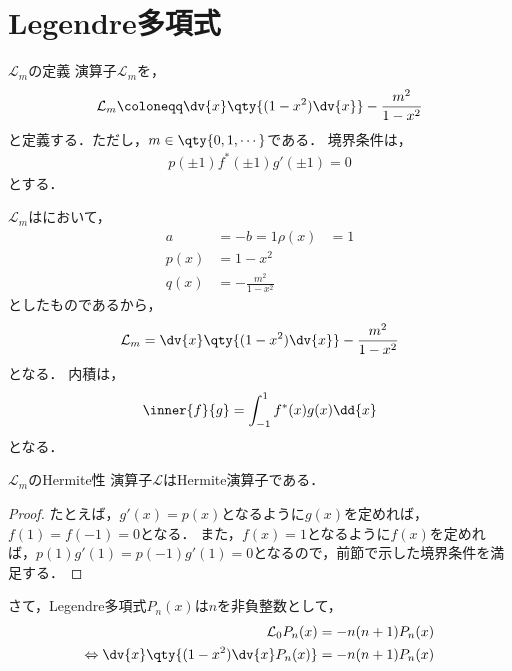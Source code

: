 \documentclass{report}
\begin{document}
    \section{Legendre多項式}
      \begin{mydef}{$\mathcal{L}_m$の定義}{}
        演算子$\mathcal{L}_m$を，
        \begin{align}
          \mathcal{L}_m \coloneqq \dv{x}\qty{(1 - x^2)\dv{x}} - \frac{m^2}{1 - x^2}
        \end{align}
        と定義する．ただし，$m\in \qty{0, 1, \cdots}$である．
        境界条件は，
          \begin{align}
            p(\pm 1)f^*(\pm 1)g'(\pm 1) = 0
          \end{align}
          とする．
      \end{mydef}
      \begin{myrem}{}{}
        $\mathcal{L}_m$はにおいて，
        \begin{align}
          a &= -b = 1
          \rho(x) &= 1 \\ 
          p(x) &= 1 - x^2 \\ 
          q(x) &= -\frac{m^2}{1 - x^2}
        \end{align}
        としたものであるから，
        \begin{align}
          \mathcal{L}_m = \dv{x}\qty{(1 - x^2)\dv{x}} - \frac{m^2}{1 - x^2}
        \end{align}
        となる．
        内積は，
        \begin{align}
          \inner{f}{g} = \int_{-1}^{1} f^*(x)g(x) \dd{x} \label{inner-prod-legendre}
        \end{align}
        となる．
      \end{myrem}
      \begin{myprop}{$\mathcal{L}_m$のHermite性}{}
        演算子$\mathcal{L}$はHermite演算子である．
        \tcblower
        \begin{proof}
          たとえば，$g'(x) = p(x)$となるように$g(x)$を定めれば，$f(1) = f(-1) = 0$となる．
          また，$f(x) = 1$となるように$f(x)$を定めれば，$p(1)g'(1) = p(-1)g'(1) = 0$となるので，前節で示した境界条件を満足する．
        \end{proof}
      \end{myprop}
      さて，Legendre多項式$P_n(x)$は$n$を非負整数として，
      \begin{align}
        \mathcal{L}_0P_n(x) &= -n(n + 1) P_n(x) \\ 
        \Leftrightarrow \dv{x}\qty{(1 - x^2)\dv{x}P_n(x)} &= -n(n + 1)P_n(x)\label{legendre-polynominal} 
      \end{align}
\end{document}
